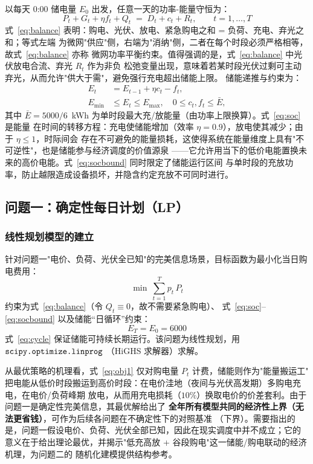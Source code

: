 \documentclass[withoutpreface]{cumcmthesis}
\begin{document}
以每天 0:00 储电量 $E_0$ 出发，任意一天的功率-能量守恒为：
\begin{equation}
    P_t + G_t + \eta f_t + Q_t \;=\; D_t + c_t + R_t,\qquad t=1,\ldots,T
    \label{eq:balance}
\end{equation}
式~\eqref{eq:balance} 表明：购电、光伏、放电、紧急购电之和 = 负荷、充电、弃光之和；等式左端
为微网"供应"侧，右端为"消纳"侧，二者在每个时段必须严格相等，故式~\eqref{eq:balance} 亦称
微网功率平衡约束。值得强调的是，式~\eqref{eq:balance} 中光伏放电合流、弃光 $R_t$ 作为非负
松弛变量出现，意味着若某时段光伏过剩可主动弃光，从而允许"供大于需"，避免强行充电超出储能上限。
储能递推与约束为：
\begin{align}
    E_t &= E_{t-1} + \eta c_t - f_t, \label{eq:soc}\\
    E_{\min} &\le E_t \le E_{\max}, \quad 0\le c_t,f_t \le \bar{E}, \label{eq:socbound}
\end{align}
其中 $\bar{E}=5000/6$~kWh 为单时段最大充/放能量（由功率上限换算）。式~\eqref{eq:soc} 是能量
在时间的转移方程：充电使储能增加（效率 $\eta=0.9$），放电使其减少；由于 $\eta\le1$，时际间会
存在不可避免的能量损耗，这使得系统在能量维度上具有"不可逆性"，也是储能参与经济调度的价值源泉
——它允许用当下的低价电能置换未来的高价电能。式~\eqref{eq:socbound} 同时限定了储能运行区间
与单时段的充放功率，防止越限造成设备损坏，并隐含约定充放不可同时进行。

\subsection{问题一：确定性每日计划（LP）}
\subsubsection{线性规划模型的建立}
针对问题一"电价、负荷、光伏全已知"的完美信息场景，目标函数为最小化当日购电费用：
\begin{equation}
    \min \ \sum_{t=1}^{T} p_t\, P_t
    \label{eq:obj1}
\end{equation}
约束为式~\eqref{eq:balance}（令 $Q_t\equiv0$，故不需要紧急购电）、
式~\eqref{eq:soc}--\eqref{eq:socbound} 以及储能“日循环”约束：
\begin{equation}
    E_T = E_0 = 6000
    \label{eq:cycle}
\end{equation}
式~\eqref{eq:cycle} 保证储能可持续长期运行。该问题为线性规划，用 $\verb|scipy.optimize.linprog|$
（HiGHS 求解器）求解。

从最优策略的机理看，式~\eqref{eq:obj1} 仅对购电量 $P_t$ 计费，储能则作为"能量搬运工"
把电能从低价时段搬运到高价时段：在电价洼地（夜间与光伏高发期）多购电充电，在电价/负荷峰期
放电，从而用充电损耗（$10\%$）换取电价的价差套利。由于问题一是确定性完美信息，其最优解给出了
\textbf{全年所有模型共同的经济性上界（无法更省钱）}，可作为后续各问题在不确定性下的对照基准
（下界）。需要指出的是，问题一假设电价、负荷、光伏全部已知，因此在现实调度中并不成立；它的
意义在于给出理论最优，并揭示"低充高放 + 谷段购电"这一储能/购电联动的经济机理，为问题二的
随机化建模提供结构参考。
\end{document}
